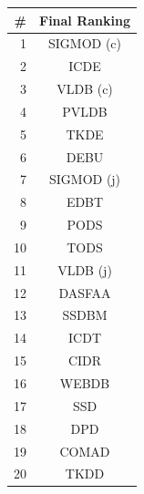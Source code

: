 \begin{table}[htbp]
\begin{tabular}{rc}
\toprule
\#		&	Final Ranking \\ 
\midrule
1		&		SIGMOD (c)	\\
2		&		ICDE		\\
3		&		VLDB (c)	\\
4		&		PVLDB		\\
5		&		TKDE		\\
6		&		DEBU		\\
7		&		SIGMOD (j)	\\
8		&		EDBT		\\
9		&		PODS		\\
10		&		TODS		\\
11		&		VLDB (j)	\\
12		&		DASFAA		\\
13		&		SSDBM		\\
14		&		ICDT		\\
15		&		CIDR		\\
16		&		WEBDB		\\
17		&		SSD			\\
18		&		DPD			\\
19		&		COMAD		\\
20		&		TKDD		\\
\bottomrule
\end{tabular}
\end{table}

